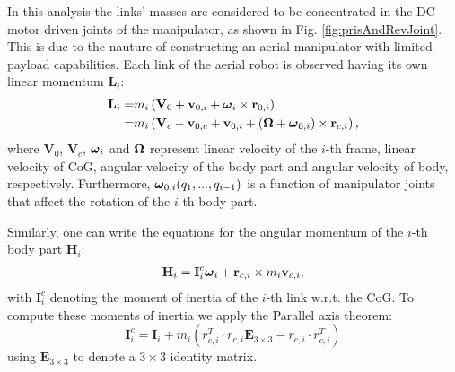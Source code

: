 In this analysis the links' masses are considered to be concentrated in the DC motor driven joints of the manipulator, as shown in Fig. \ref{fig:prisAndRevJoint}. This is due to the nauture of constructing an aerial manipulator with limited payload capabilities. Each link of the aerial robot is observed having its own linear momentum $\textbf{L}_{i}$:
\begin{align}
\textbf{L}_{i}=& m_i \left ( \textbf{V}_0+\textbf{v}_{0,i} + \boldsymbol{\omega}_i \times \textbf{r}_{0,i}\right) \\ \nonumber
=&m_i \left ( \textbf{V}_c - \textbf{v}_{0,c}+\textbf{v}_{0,i}  + (\boldsymbol{\Omega} + \boldsymbol{\omega}_{0,i}) \times \textbf{r}_{c,i}\right),
\end{align}  
where $\textbf{V}_0$, $\textbf{V}_c$, $\boldsymbol{\omega}_i$ and $\boldsymbol{\Omega}$ represent linear velocity of the $i$-th frame, linear velocity of CoG, angular velocity of the body part and angular velocity of body, respectively. Furthermore, $\boldsymbol{\omega}_{0,i}(q_1, ..., q_{i-1})$ is a function of manipulator joints that affect the rotation of the $i$-th body part.  

Similarly, one can write the equations for the angular momentum of the $i$-th body part $\textbf{H}_i$:
\begin{align}
\textbf{H}_i = \textbf{I}_i^c \boldsymbol{\omega}_i+\textbf{r}_{c,i} \times m_i \textbf{v}_{c,i},
\end{align}
with $\textbf{I}_i^c$ denoting the moment of inertia of the $i$-th link w.r.t. the CoG. To compute these moments of inertia we apply the Parallel axis theorem:
\begin{equation}
\textbf{I}_i^c=\textbf{I}_i+m_i\left( r_{c,i}^T\cdot r_{c,i} \textbf{E}_{3 \times 3} - r_{c,i}\cdot r_{c,i}^T \right)
\end{equation}
using $\textbf{E}_{3 \times 3}$ to denote a $3 \times 3$ identity matrix.

